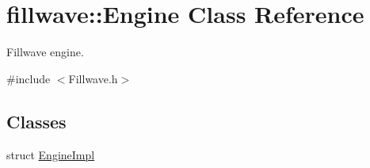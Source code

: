 \hypertarget{classfillwave_1_1Engine}{}\section{fillwave\+:\+:Engine Class Reference}
\label{classfillwave_1_1Engine}


Fillwave engine.  




{\ttfamily \#include $<$Fillwave.\+h$>$}

\subsection*{Classes}
\begin{DoxyCompactItemize}
\item 
struct \hyperlink{structfillwave_1_1Engine_1_1EngineImpl}{Engine\+Impl}
\end{DoxyCompactItemize}
